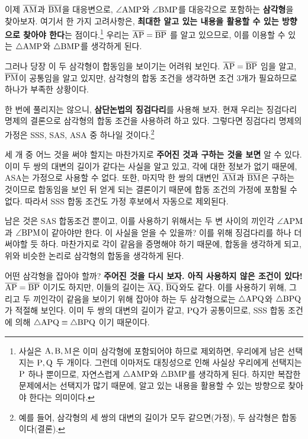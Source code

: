 이제 \(\overline{\rm{AM}}\)과 \(\overline{\rm{BM}}\)을 대응변으로, \(\angle \rm{AMP}\)와 \(\angle \rm{BMP}\)를 대응각으로 포함하는 \textbf{삼각형}을 찾아보자. 여기서 한 가지 고려사항은, \textbf{최대한 알고 있는 내용을 활용할 수 있는 방향으로 찾아야 한다}는 점이다.\footnote{사실은 \(\rm{A}, \rm{B}, \rm{M}\)은 이미 삼각형에 포함되어야 하므로 제외하면, 우리에게 남은 선택지는 \(\rm{P}, \rm{Q}\) 두 개이다. 그런데 이마저도 대칭성으로 인해 사실상 우리에게 선택지는 \(\rm{P}\) 하나 뿐이므로, 자연스럽게 \(\triangle \rm{AMP}\)와 \(\triangle \rm{BMP}\)를 생각하게 된다. 하지만 복잡한 문제에서는 선택지가 많기 때문에, 알고 있는 내용을 활용할 수 있는 방향으로 찾아야 한다는 의미이다.} 우리는 \(\overline{\rm{AP}} = \overline{\rm{BP}}\) 를 알고 있으므로, 이를 이용할 수 있는 \(\triangle \rm{AMP}\)와 \(\triangle \rm{BMP}\)를 생각하게 된다.

그러나 당장 이 두 삼각형이 합동임을 보이기는 어려워 보인다. \(\overline{\rm{AP}} = \overline{\rm{BP}}\) 임을 알고, \(\overline{\rm{PM}}\)이 공통임을 알고 있지만, 삼각형의 합동 조건을 생각하면 조건 3개가 필요하므로 하나가 부족한 상황이다.

한 번에 풀리지는 않으니, \textbf{삼단논법의 징검다리}를 사용해 보자. 현재 우리는 징검다리 명제의 결론으로 삼각형의 합동 조건을 사용하려 하고 있다. 그렇다면 징검다리 명제의 가정은 SSS, SAS, ASA 중 하나일 것이다.\footnote{예를 들어, 삼각형의 세 쌍의 대변의 길이가 모두 같으면(가정), 두 삼각형은 합동이다(결론).}

세 개 중 어느 것을 써야 할지는 마찬가지로 \textbf{주어진 것과 구하는 것을 보면} 알 수 있다. 이미 두 쌍의 대변의 길이가 같다는 사실을 알고 있고, 각에 대한 정보가 없기 때문에, ASA는 가정으로 사용할 수 없다. 또한, 마지막 한 쌍의 대변인 \(\overline{\rm{AM}}\)과 \(\overline{\rm{BM}}\)은 구하는 것이므로 합동임을 보인 뒤 얻게 되는 결론이기 때문에 합동 조건의 가정에 포함될 수 없다. 따라서 SSS 합동 조건도 가정 후보에서 자동으로 제외된다.

남은 것은 SAS 합동조건 뿐이고, 이를 사용하기 위해서는 두 변 사이의 끼인각 \(\angle \rm{APM}\)과 \(\angle \rm{BPM}\)이 같아야만 한다. 이 사실을 얻을 수 있을까? 이를 위해 징검다리를 하나 더 써야할 듯 하다. 마찬가지로 각이 같음을 증명해야 하기 때문에, 합동을 생각하게 되고, 위와 비슷한 논리로 삼각형의 합동을 생각하게 된다.

어떤 삼각형을 잡아야 할까? \textbf{주어진 것을 다시 보자. 아직 사용하지 않은 조건이 있다!} \(\overline{\rm{AP}} = \overline{\rm{BP}}\) 이기도 하지만, 이들의 길이는 \(\overline{\rm{AQ}}\), \(\overline{\rm{BQ}}\)와도 같다. 이를 사용하기 위해, 그리고 두 끼인각이 같음을 보이기 위해 잡아야 하는 두 삼각형으로는 \(\triangle \rm{APQ}\)와 \(\triangle \rm{BPQ}\)가 적절해 보인다. 이미 두 쌍의 대변의 길이가 같고, \(\rm{PQ}\)가 공통이므로, SSS 합동 조건에 의해 \(\triangle \rm{APQ} \equiv \triangle BPQ\) 이기 때문이다.

